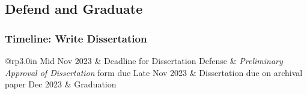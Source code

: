\subsection{Defend and Graduate}
\begin{frame}[t]
	\frametitle{Timeline:  Write Dissertation}
\Large


\begin{tabular}{@{}rp{3.0in}}
	Mid Nov 2023 & Deadline for Dissertation Defense \cr
	 & {\it Preliminary Approval of Dissertation} form due \cr
	 Late Nov 2023 & Dissertation due on archival paper  Dec 2023 & Graduation \cr
\end{tabular}
\end{frame}
